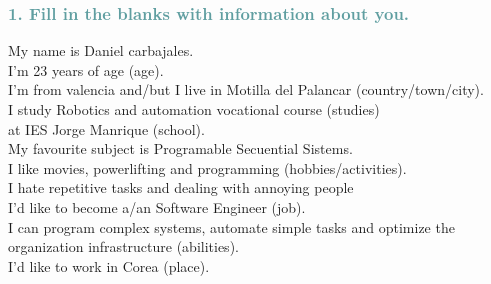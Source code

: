 \documentclass[spanish,openany]{report}
\begin{document}
\subsubsection*{\textcolor{CadetBlue}{1. Fill in the blanks with information about you.}} 
My name is Daniel carbajales.\\ 
I’m 23 years of age (age).\\ 
I’m from valencia  and/but I live in Motilla del Palancar (country/town/city). \\
I study Robotics and automation vocational course (studies) \\
at IES Jorge Manrique (school). \\
My favourite subject is Programable Secuential Sistems.\\
I like movies, powerlifting and programming (hobbies/activities). \\
I hate repetitive tasks and dealing with annoying people\\
I’d like to become a/an Software Engineer (job). \\
I can program complex systems, automate simple tasks  and optimize the organization infrastructure (abilities). \\
I’d like to work in Corea (place). \\






\end{document}
